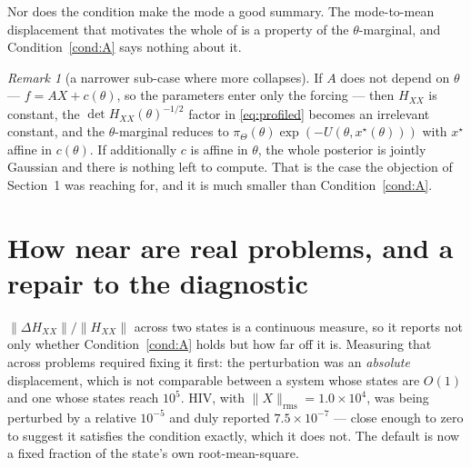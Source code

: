 \documentclass[11pt]{article}
\newcommand{\Hxx}{H_{\!X\!X}}
\newcommand{\xstar}{x^{\star}}
\theoremstyle{plain}
\theoremstyle{definition}
\theoremstyle{remark}
\newtheorem{remark}{Remark}
\begin{document}
Nor does the condition make the mode a good summary. The mode-to-mean displacement that motivates
the whole of \cite{companion1} is a property of the $\theta$-marginal, and Condition~\ref{cond:A}
says nothing about it.

\begin{remark}[a narrower sub-case where more collapses]
If $A$ does not depend on $\theta$ --- $f = AX + c(\theta)$, so the parameters enter only the
forcing --- then $\Hxx$ is constant, the $\det\Hxx(\theta)^{-1/2}$ factor in \eqref{eq:profiled}
becomes an irrelevant constant, and the $\theta$-marginal reduces to
$\pi_\Theta(\theta)\exp(-U(\theta,\xstar(\theta)))$ with $\xstar$ affine in $c(\theta)$. If
additionally $c$ is affine in $\theta$, the whole posterior is jointly Gaussian and there is
nothing left to compute. That is the case the objection of Section~1 was reaching for, and it is
much smaller than Condition~\ref{cond:A}.
\end{remark}

\section{How near are real problems, and a repair to the diagnostic}
\label{sec:near}

$\|\Delta \Hxx\|/\|\Hxx\|$ across two states is a continuous measure, so it reports not only
whether Condition~\ref{cond:A} holds but how far off it is. Measuring that across problems
required fixing it first: the perturbation was an \emph{absolute} displacement, which is not
comparable between a system whose states are $O(1)$ and one whose states reach $10^{5}$. HIV, with
$\|X\|_{\mathrm{rms}} = 1.0\times10^{4}$, was being perturbed by a relative $10^{-5}$ and duly
reported $7.5\times10^{-7}$ --- close enough to zero to suggest it satisfies the condition exactly,
which it does not. The default is now a fixed fraction of the state's own root-mean-square.
\end{document}
